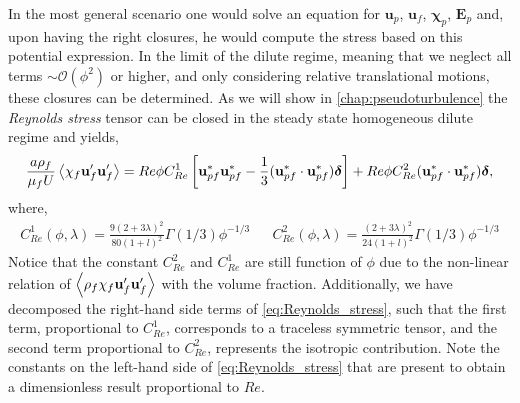In the most general scenario one would solve an equation for $\textbf{u}_p$, $\textbf{u}_f$, $\bm\chi_p$, $\textbf{E}_p$ and, upon having the right closures, he would compute the stress based on this potential expression. 
In the limit of the dilute regime, meaning that we neglect all terms $\sim \mathcal{O}(\phi^2)$ or higher, and only considering relative translational motions, these closures can be determined. 
As we will show in \ref{chap:pseudoturbulence} the \textit{Reynolds stress} tensor can be closed in the steady state homogeneous dilute regime and yields, 
\begin{equation}
    \frac{a \rho_f}{\mu_f U}\avg{\chi_f \textbf{u}_f'\textbf{u}'_f}
    = Re  \phi C_{Re}^1 \left[
        \textbf{u}_{pf}^*
        \textbf{u}_{pf}^*
        -\frac{1}{3}
        (\textbf{u}_{pf}^*
        \cdot\textbf{u}_{pf}^*)\bm\delta
    \right]
    + Re \phi C_{Re}^2 (\textbf{u}_{pf}^*\cdot\textbf{u}_{pf}^*) \bm\delta, 
    \label{eq:Reynolds_stress}
\end{equation}
where, 
\begin{align*}
    C_{Re}^1(\phi,\lambda)
    = 
        \frac{9(2+3\lambda)^2}{80(1+l)^2}\Gamma(1/3) \phi^{-1/3}
    && 
    C_{Re}^2(\phi,\lambda)
    = 
        \frac{(2+3\lambda)^2}{24(1+l)^2}\Gamma(1/3) \phi^{-1/3}
\end{align*}
Notice that the constant $C_{Re}^2$ and $C_{Re}^1$ are still function of $\phi$ due to the non-linear relation of $\left<\rho_f\chi_f\textbf{u}_f'\textbf{u}'_f\right>$ with the volume fraction. 
Additionally, we have decomposed the right-hand side terms of \ref{eq:Reynolds_stress}, such that the first term, proportional to $C_{Re}^1$, corresponds to a traceless symmetric tensor, and the second term proportional to $C_{Re}^2$, represents the isotropic contribution.  
Note the constants on the left-hand side of \ref{eq:Reynolds_stress} that are present to obtain a dimensionless result proportional to $Re$. 

